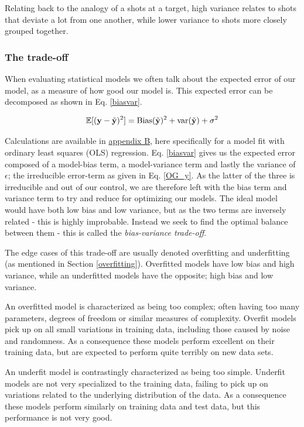 Relating back to the analogy of a shots at a target, high variance relates to shots that deviate a lot from one another, while lower variance to shots more closely grouped together.  

\subsubsection{The trade-off}


When evaluating statistical models we often talk about the expected error of our model, as a measure of how good our model is. This expected error can be decomposed as shown in Eq. \ref{biasvar}. 

\begin{equation}\label{biasvar}
    \mathbb{E}[(\mathbf{y} - \Tilde{\mathbf{y}})^2] = \text{Bias}(\Tilde{\mathbf{y}})^2 + \text{var}(\Tilde{\mathbf{y}}) + \sigma^2
\end{equation}

Calculations are available in \hyperref[appendixB]{appendix B}, here specifically for a model fit with ordinary least squares (OLS) regression. 
Eq. \ref{biasvar} gives us the expected error composed of a model-bias term, a model-variance term and lastly the variance of $\epsilon$; the irreducible error-term as given in Eq. \ref{OG_y}. As the latter of the three is irreducible and out of our control, we are therefore left with the bias term and variance term to try and reduce for optimizing our models. 
The ideal model would have both low bias and low variance, but as the two terms are inversely related - this is highly improbable. Instead we seek to find the optimal balance between them - this is called the \textit{bias-variance trade-off}. 

The edge cases of this trade-off are usually denoted overfitting and underfitting (as mentioned in Section \ref{overfitting}). Overfitted models have low bias and high variance, while an underfitted models have the opposite; high bias and low variance. 

An overfitted model is characterized as being too complex; often having too many parameters, degrees of freedom or similar measures of complexity. 
Overfit models pick up on all small variations in training data, including those caused by noise and randomness. As a consequence these models perform excellent on their training data, but are expected to perform quite terribly on new data sets. 

An underfit model is contrastingly characterized as being too simple. Underfit models are not very specialized to the training data, failing to pick up on variations related to the underlying distribution of the data. As a consequence these models perform similarly on training data and test data, but this performance is not very good. 


